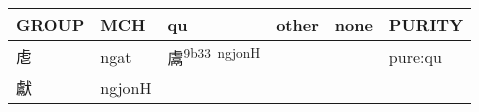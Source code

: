 \documentclass[14pt,a4paper]{scrartcl}
\begin{document}
\begin{longtable}[c]{@{}llllll@{}}
\toprule
\begin{minipage}[b]{0.14\columnwidth}\raggedright\strut
GROUP
\strut\end{minipage} &
\begin{minipage}[b]{0.14\columnwidth}\raggedright\strut
MCH
\strut\end{minipage} &
\begin{minipage}[b]{0.14\columnwidth}\raggedright\strut
qu
\strut\end{minipage} &
\begin{minipage}[b]{0.14\columnwidth}\raggedright\strut
other
\strut\end{minipage} &
\begin{minipage}[b]{0.14\columnwidth}\raggedright\strut
none
\strut\end{minipage} &
\begin{minipage}[b]{0.14\columnwidth}\raggedright\strut
PURITY
\strut\end{minipage}\tabularnewline
\midrule
\endhead
\begin{minipage}[t]{0.14\columnwidth}\raggedright\strut
䖈
\strut\end{minipage} &
\begin{minipage}[t]{0.14\columnwidth}\raggedright\strut
ngat
\strut\end{minipage} &
\begin{minipage}[t]{0.14\columnwidth}\raggedright\strut
鬳\textsuperscript{9b33~ngjonH}
\strut\end{minipage} &
\begin{minipage}[t]{0.14\columnwidth}\raggedright\strut
\strut\end{minipage} &
\begin{minipage}[t]{0.14\columnwidth}\raggedright\strut
\strut\end{minipage} &
\begin{minipage}[t]{0.14\columnwidth}\raggedright\strut
pure:qu
\strut\end{minipage}\tabularnewline
\begin{minipage}[t]{0.14\columnwidth}\raggedright\strut
獻
\strut\end{minipage} &
\begin{minipage}[t]{0.14\columnwidth}\raggedright\strut
ngjonH
\strut\end{minipage} &
\begin{minipage}[t]{0.14\columnwidth}\raggedright\strut
\strut\end{minipage} &

\end{longtable}
\end{document}
